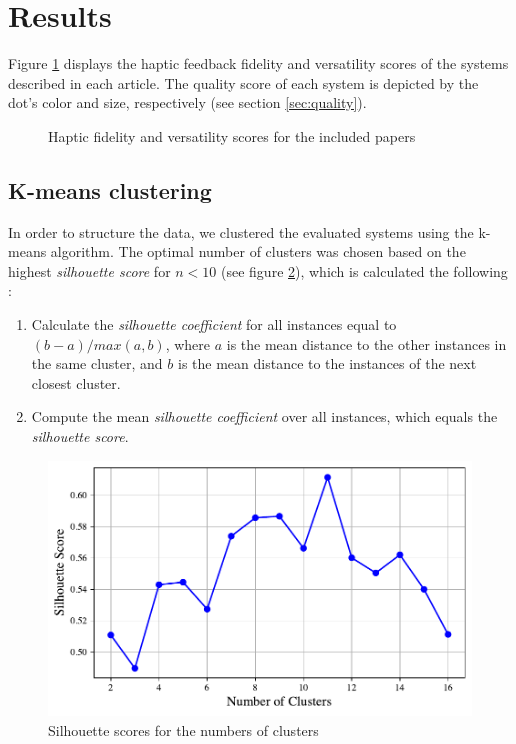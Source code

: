 \section{Results}
\label{sec:results}
Figure \ref{fig:fidelity_plot} displays the haptic feedback fidelity and versatility scores of the systems described in each article. The quality score of each system is depicted by the dot's color and size, respectively (see section \ref{sec:quality}).

\begin{figure}[htbp]
    
    \caption{Haptic fidelity and versatility scores for the included papers}
    \label{fig:fidelity_plot}
\end{figure}

\subsection{K-means clustering}
In order to structure the data, we clustered the evaluated systems using the k-means algorithm. The optimal number of clusters was chosen based on the highest \textit{silhouette score} for $n<10$ (see figure \ref{fig:silhouette}), which is calculated the following \cite{Rousseeuw1987Silhouettes:Analysis}:
\begin{enumerate}
    \item Calculate the \textit{silhouette coefficient} for all instances equal to $(b-a) / max(a,b)$, where $a$ is the mean distance to the other instances in the same cluster, and $b$ is the mean distance to the instances of the next closest cluster.
    \item Compute the mean \textit{silhouette coefficient} over all instances, which equals the \textit{silhouette score}.
\end{enumerate}

\begin{figure}[htbp]
    \centering
    \includegraphics[width=\columnwidth]{figures/silhouette.pdf} 
    \caption{Silhouette scores for the numbers of clusters}
    \label{fig:silhouette}
\end{figure}

